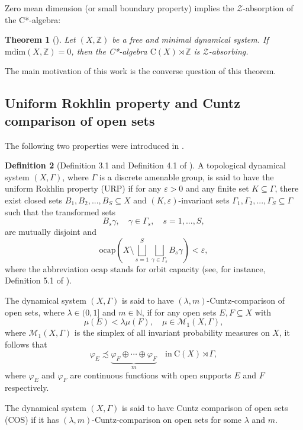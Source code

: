 \documentclass[12pt, oneside, psamsfonts]{amsart}
\newtheorem{thm}{Theorem}[section]
\theoremstyle{definition}
\newtheorem{defn}[thm]{Definition}
\theoremstyle{remark}
\numberwithin{equation}{section}
\newcommand{\Int}{\mathbb Z}
\newcommand{\eps}{\varepsilon}
\begin{document}
Zero mean dimension (or small boundary property) implies the $\mathcal Z$-absorption of the C*-algebra:
\begin{thm}[\cite{EN-MD0}]\label{old-thm}
Let $(X, \Int)$ be a free and minimal dynamical system. If $\mathrm{mdim}(X, \Int) = 0$, then the C*-algebra $\mathrm{C}(X) \rtimes \Int$ is $\mathcal Z$-absorbing.
\end{thm}

The main motivation of this work is the converse question of this theorem.
 

\subsection{Uniform Rokhlin property and Cuntz comparison of open sets}

The following two properties were introduced in \cite{Niu-MD-Z}.
\begin{defn}[Definition 3.1 and Definition 4.1 of \cite{Niu-MD-Z}]\label{defn-URP-COS}
A topological dynamical system $(X, \Gamma)$, where $\Gamma$ is a discrete amenable group, is said to have the uniform Rokhlin property (URP) if for any $\eps>0$ and any finite set $K\subseteq \Gamma$, there exist closed sets $B_1, B_2, ..., B_S \subseteq X$ and $(K, \eps)$-invariant sets $\Gamma_1, \Gamma_2, ..., \Gamma_S \subseteq \Gamma$ such that the transformed sets 
$$B_s\gamma,\quad \gamma\in \Gamma_s,\quad s=1, ..., S, $$
are mutually disjoint and  
$$\mathrm{ocap}(X\setminus\bigsqcup_{s=1}^S\bigsqcup_{\gamma\in \Gamma_s}B_s\gamma) < \eps,$$
where the abbreviation $\mathrm{ocap}$ stands for orbit capacity (see, for instance, Definition 5.1 of \cite{Lindenstrauss-Weiss-MD}).

The dynamical system $(X, \Gamma)$ is said to have $(\lambda, m)$-Cuntz-comparison of open sets, where $\lambda\in (0, 1]$ and $m\in \mathbb N$, if for any open sets $E, F\subseteq X$ with $$ \mu(E) < \lambda \mu(F),\quad \mu \in\mathcal M_1(X, \Gamma),$$ 
where $\mathcal{M}_1(X, \Gamma)$ is the simplex of all invariant probability measures on $X$, it follows that 
$$\varphi_E \precsim \underbrace{\varphi_F\oplus\cdots \oplus \varphi_F}_m\quad\mathrm{in}\ \mathrm{C}(X)\rtimes\Gamma,$$ 
where $\varphi_E$ and $\varphi_F$ are continuous functions with open supports $E$ and $F$ respectively.

The dynamical system $(X, \Gamma)$ is said to have Cuntz comparison of open sets (COS) if it has $(\lambda, m)$-Cuntz-comparison on open sets for some $\lambda$ and $m$.
\end{defn}
\end{document}
